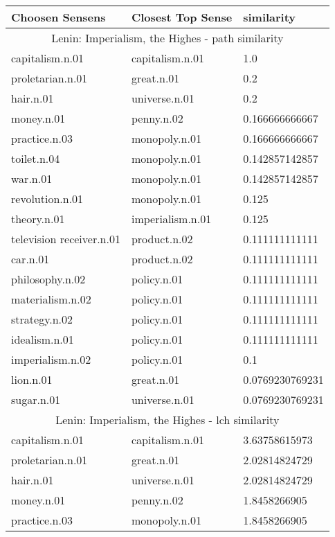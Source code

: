 
    \begin{center}
      \begin{tabular}{ | l | l | l |}
        \hline
        Choosen Sensens & Closest Top Sense & similarity  \\ \hline
\multicolumn{3}{|c|}{Lenin: Imperialism, the Highes - path similarity} \\ \hline
capitalism.n.01 & capitalism.n.01 & 1.0 \\ \hline
proletarian.n.01 & great.n.01 & 0.2 \\ \hline
hair.n.01 & universe.n.01 & 0.2 \\ \hline
money.n.01 & penny.n.02 & 0.166666666667 \\ \hline
practice.n.03 & monopoly.n.01 & 0.166666666667 \\ \hline
toilet.n.04 & monopoly.n.01 & 0.142857142857 \\ \hline
war.n.01 & monopoly.n.01 & 0.142857142857 \\ \hline
revolution.n.01 & monopoly.n.01 & 0.125 \\ \hline
theory.n.01 & imperialism.n.01 & 0.125 \\ \hline
television receiver.n.01 & product.n.02 & 0.111111111111 \\ \hline
car.n.01 & product.n.02 & 0.111111111111 \\ \hline
philosophy.n.02 & policy.n.01 & 0.111111111111 \\ \hline
materialism.n.02 & policy.n.01 & 0.111111111111 \\ \hline
strategy.n.02 & policy.n.01 & 0.111111111111 \\ \hline
idealism.n.01 & policy.n.01 & 0.111111111111 \\ \hline
imperialism.n.02 & policy.n.01 & 0.1 \\ \hline
lion.n.01 & great.n.01 & 0.0769230769231 \\ \hline
sugar.n.01 & universe.n.01 & 0.0769230769231 \\ \hline
\multicolumn{3}{|c|}{Lenin: Imperialism, the Highes - lch similarity} \\ \hline
capitalism.n.01 & capitalism.n.01 & 3.63758615973 \\ \hline
proletarian.n.01 & great.n.01 & 2.02814824729 \\ \hline
hair.n.01 & universe.n.01 & 2.02814824729 \\ \hline
money.n.01 & penny.n.02 & 1.8458266905 \\ \hline
practice.n.03 & monopoly.n.01 & 1.8458266905 \\ \hline

\end{tabular}
\end{center}
